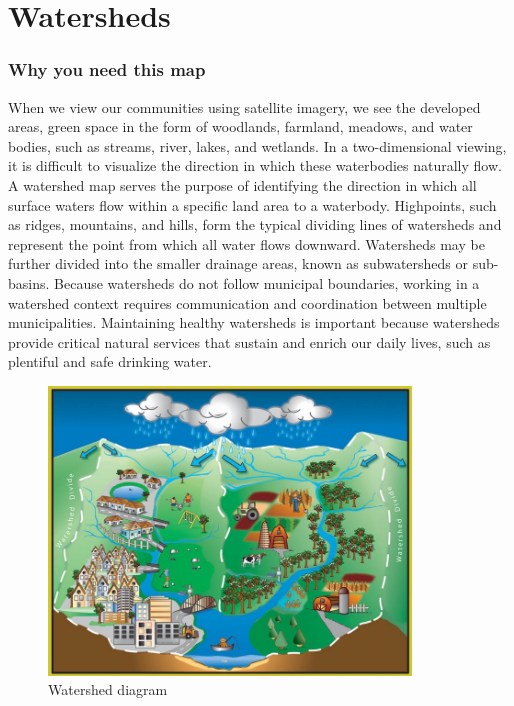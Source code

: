 \chapter{Watersheds}\label{subsec:watersheds}
\subsection*{Why you need this map}
When we view our communities using satellite imagery, we see the developed 
areas, green space in the form of woodlands, farmland, meadows, and water 
bodies, such as streams, river, lakes, and wetlands. In a two-dimensional 
viewing, it is difficult to visualize the direction in which these waterbodies 
naturally flow. A watershed map serves the purpose of identifying the direction 
in which all surface waters flow within a specific land area to a waterbody. 
Highpoints, such as ridges, mountains, and hills, form the typical dividing 
lines of watersheds and represent the point from which all water flows 
downward. Watersheds may be further divided into the smaller drainage areas, 
known as subwatersheds or sub-basins. Because watersheds do not follow 
municipal boundaries, working in a watershed context requires communication and 
coordination between multiple municipalities. Maintaining healthy watersheds is 
important because watersheds provide critical natural services that sustain and 
enrich our daily lives, such as plentiful and safe drinking water.

\begin{figure}
    \includegraphics[width=9.62cm, keepaspectratio]{images/watershed_riveralliance.jpg}
  \caption{Watershed diagram}\label{fig:watershed}
  \vspace{-10pt}
\end{figure}

